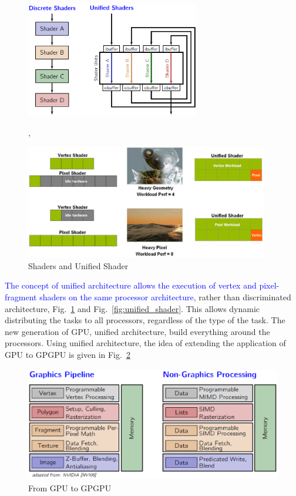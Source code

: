 \begin{figure}[hbt]
  \centerline{\includegraphics[height=5cm,
    angle=0]{./images/gpu_shader_1.eps}},
  \centerline{\includegraphics[height=5cm, angle=0]{./images/unified_shaders_2.eps}}
  \caption{Shaders and Unified Shader}
  \label{fig:shader_unified_shader}
\end{figure}

\textcolor{blue}{The concept of unified architecture allows the
  execution of vertex and pixel-fragment shaders on the same
  processor architecture}, rather than discriminated architecture,
  Fig.~\ref{fig:shader_unified_shader} and
  Fig.~\ref{fig:unified_shader}. This allows dynamic distributing the
  tasks to all processors, regardless of the type of the task. The new
  generation of GPU, unified architecture, build everything around the
  processors.  Using unified architecture, the idea of extending the
  application of GPU to GPGPU is given in Fig.~\ref{fig:GPU_GPGPU}

\begin{figure}[hbt]
  \centerline{\includegraphics[height=5cm,
    angle=0]{./images/GPU2GPGPU.eps}}
  \caption{From GPU to GPGPU}
  \label{fig:GPU_GPGPU}
\end{figure}

